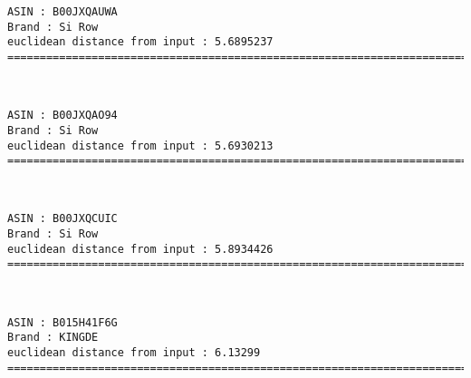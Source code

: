 \documentclass[11pt]{article}
\begin{document}
    \begin{Verbatim}[commandchars=\\\{\}]
ASIN : B00JXQAUWA
Brand : Si Row
euclidean distance from input : 5.6895237
=============================================================================================================================

    \end{Verbatim}

    \begin{center}
    \end{center}
    { \hspace*{\fill} \\}
    
    \begin{Verbatim}[commandchars=\\\{\}]
ASIN : B00JXQAO94
Brand : Si Row
euclidean distance from input : 5.6930213
=============================================================================================================================

    \end{Verbatim}

    \begin{center}
    \end{center}
    { \hspace*{\fill} \\}
    
    \begin{Verbatim}[commandchars=\\\{\}]
ASIN : B00JXQCUIC
Brand : Si Row
euclidean distance from input : 5.8934426
=============================================================================================================================

    \end{Verbatim}

    \begin{center}
    \end{center}
    { \hspace*{\fill} \\}
    
    \begin{Verbatim}[commandchars=\\\{\}]
ASIN : B015H41F6G
Brand : KINGDE
euclidean distance from input : 6.13299
=============================================================================================================================

    \end{Verbatim}
\end{document}
